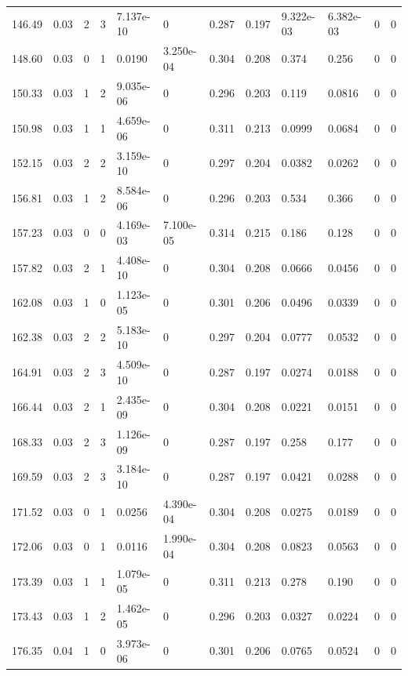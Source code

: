 \documentclass[preview]{standalone}
\begin{document}
{{{\begin{tabular}{L{1.2cm}C{1.2cm} C{0.3cm}C{0.5cm} C{1.4cm}C{1.4cm} C{1.4cm}C{1.4cm} C{1.6cm}C{1.6cm} C{1.6cm}C{1.6cm}}
  146.49  &  0.03  & 2     &  3 &  7.137e-10  & 0  &  0.287&   0.197& 9.322e-03 & 6.382e-03   &  0 & 0  \\ 
  148.60  &  0.03  & 0     &  1 &  0.0190  & 3.250e-04  &  0.304&   0.208& 0.374 & 0.256   &  0 & 0  \\ 
  150.33  &  0.03  & 1     &  2 &  9.035e-06  & 0  &  0.296&   0.203& 0.119 & 0.0816   &  0 & 0  \\ 
  150.98  &  0.03  & 1     &  1 &  4.659e-06  & 0  &  0.311&   0.213& 0.0999 & 0.0684   &  0 & 0  \\ 
  152.15  &  0.03  & 2     &  2 &  3.159e-10  & 0  &  0.297&   0.204& 0.0382 & 0.0262   &  0 & 0  \\ 
  156.81  &  0.03  & 1     &  2 &  8.584e-06  & 0  &  0.296&   0.203& 0.534 & 0.366   &  0 & 0  \\ 
  157.23  &  0.03  & 0     &  0 &  4.169e-03  & 7.100e-05  &  0.314&   0.215& 0.186 & 0.128   &  0 & 0  \\ 
  157.82  &  0.03  & 2     &  1 &  4.408e-10  & 0  &  0.304&   0.208& 0.0666 & 0.0456   &  0 & 0  \\ 
  162.08  &  0.03  & 1     &  0 &  1.123e-05  & 0  &  0.301&   0.206& 0.0496 & 0.0339   &  0 & 0  \\ 
  162.38  &  0.03  & 2     &  2 &  5.183e-10  & 0  &  0.297&   0.204& 0.0777 & 0.0532   &  0 & 0  \\ 
  164.91  &  0.03  & 2     &  3 &  4.509e-10  & 0  &  0.287&   0.197& 0.0274 & 0.0188   &  0 & 0  \\ 
  166.44  &  0.03  & 2     &  1 &  2.435e-09  & 0  &  0.304&   0.208& 0.0221 & 0.0151   &  0 & 0  \\ 
  168.33  &  0.03  & 2     &  3 &  1.126e-09  & 0  &  0.287&   0.197& 0.258 & 0.177   &  0 & 0  \\ 
  169.59  &  0.03  & 2     &  3 &  3.184e-10  & 0  &  0.287&   0.197& 0.0421 & 0.0288   &  0 & 0  \\ 
  171.52  &  0.03  & 0     &  1 &  0.0256  & 4.390e-04  &  0.304&   0.208& 0.0275 & 0.0189   &  0 & 0  \\ 
  172.06  &  0.03  & 0     &  1 &  0.0116  & 1.990e-04  &  0.304&   0.208& 0.0823 & 0.0563   &  0 & 0  \\ 
  173.39  &  0.03  & 1     &  1 &  1.079e-05  & 0  &  0.311&   0.213& 0.278 & 0.190   &  0 & 0  \\ 
  173.43  &  0.03  & 1     &  2 &  1.462e-05  & 0  &  0.296&   0.203& 0.0327 & 0.0224   &  0 & 0  \\ 
  176.35  &  0.04  & 1     &  0 &  3.973e-06  & 0  &  0.301&   0.206& 0.0765 & 0.0524   &  0 & 0  \\ 

\end{tabular}}}}
\end{document}
